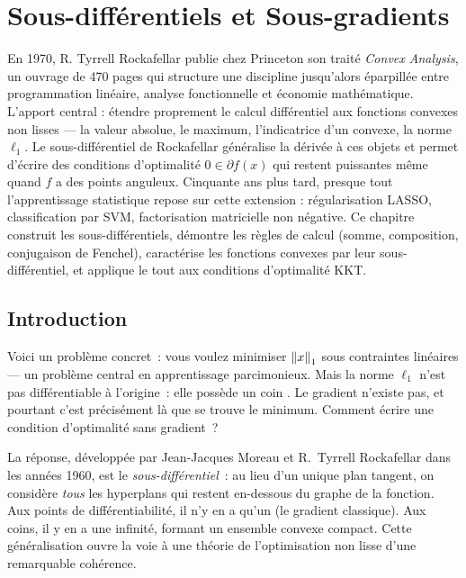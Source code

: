 \chapter{Sous-diff\'erentiels et Sous-gradients}
\label{ch:sous_differentiels}

En 1970, R. Tyrrell Rockafellar publie chez Princeton son traité \emph{Convex Analysis}, un ouvrage de 470 pages qui structure une discipline jusqu'alors éparpillée entre programmation linéaire, analyse fonctionnelle et économie mathématique. L'apport central : étendre proprement le calcul différentiel aux fonctions convexes non lisses --- la valeur absolue, le maximum, l'indicatrice d'un convexe, la norme $\ell_1$. Le sous-différentiel de Rockafellar généralise la dérivée à ces objets et permet d'écrire des conditions d'optimalité $0 \in \partial f(x)$ qui restent puissantes même quand $f$ a des points anguleux. Cinquante ans plus tard, presque tout l'apprentissage statistique repose sur cette extension : régularisation LASSO, classification par SVM, factorisation matricielle non négative. Ce chapitre construit les sous-différentiels, démontre les règles de calcul (somme, composition, conjugaison de Fenchel), caractérise les fonctions convexes par leur sous-différentiel, et applique le tout aux conditions d'optimalité KKT.

\section{Introduction}

Voici un probl\`eme concret~: vous voulez minimiser $\left\| x \right\|_1$ sous contraintes lin\'eaires --- un probl\`eme central en apprentissage parcimonieux. Mais la norme $\ell_1$ n'est pas diff\'erentiable \`a l'origine~: elle poss\`ede un \og coin \fg. Le gradient n'existe pas, et pourtant c'est pr\'ecis\'ement l\`a que se trouve le minimum. Comment \'ecrire une condition d'optimalit\'e sans gradient~?

La r\'eponse, d\'evelopp\'ee par Jean-Jacques Moreau et R.~Tyrrell Rockafellar dans les ann\'ees 1960, est le \emph{sous-diff\'erentiel}~: au lieu d'un unique plan tangent, on consid\`ere \emph{tous} les hyperplans qui restent en-dessous du graphe de la fonction. Aux points de diff\'erentiabilit\'e, il n'y en a qu'un (le gradient classique). Aux coins, il y en a une infinit\'e, formant un ensemble convexe compact. Cette g\'en\'eralisation ouvre la voie \`a une th\'eorie de l'optimisation non lisse d'une remarquable coh\'erence.

